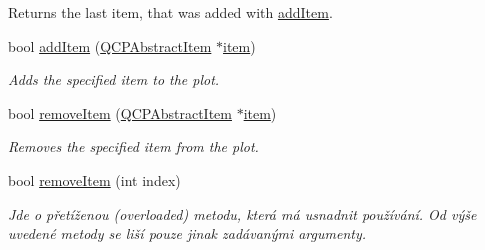 \begin{DoxyCompactItemize}
\begin{DoxyCompactList}
Returns the last item, that was added with \hyperlink{classQCustomPlot_aa500620379262321685cb7a7674cbd2a}{add\+Item}. \end{DoxyCompactList}\item 
bool \hyperlink{classQCustomPlot_aa500620379262321685cb7a7674cbd2a}{add\+Item} (\hyperlink{classQCPAbstractItem}{Q\+C\+P\+Abstract\+Item} $\ast$\hyperlink{classQCustomPlot_a3e842b5a65b1d17fbb96cfb1fa1314d1}{item})
\begin{DoxyCompactList}\small\item\em Adds the specified item to the plot. \end{DoxyCompactList}\item 
bool \hyperlink{classQCustomPlot_ae04446557292551e8fb6e2c106e1848d}{remove\+Item} (\hyperlink{classQCPAbstractItem}{Q\+C\+P\+Abstract\+Item} $\ast$\hyperlink{classQCustomPlot_a3e842b5a65b1d17fbb96cfb1fa1314d1}{item})
\begin{DoxyCompactList}\small\item\em Removes the specified item from the plot. \end{DoxyCompactList}\item 
\hypertarget{classQCustomPlot_abcfdda3d601c0441cab136137d715dea}{}bool \hyperlink{classQCustomPlot_abcfdda3d601c0441cab136137d715dea}{remove\+Item} (int index)\label{classQCustomPlot_abcfdda3d601c0441cab136137d715dea}

\begin{DoxyCompactList}\small\item\em Jde o přetíženou (overloaded) metodu, která má usnadnit používání. Od výše uvedené metody se liší pouze jinak zadávanými argumenty.


\end{DoxyCompactList}
\end{DoxyCompactItemize}
